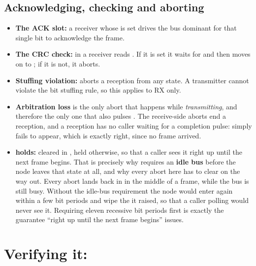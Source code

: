 \subsection*{Acknowledging, checking and aborting}
\begin{itemize}
  \item \textbf{The ACK slot:} a receiver whose  is set drives the bus dominant for
    that single bit to acknowledge the frame.
  \item \textbf{The CRC check:} in  a receiver reads . If it
    is set it waits for  and then moves on to ; if it is not,
    it aborts.
  \item \textbf{Stuffing violation:}  aborts a reception from any
    state. A transmitter cannot violate the bit stuffing rule, so this applies to RX only.
  \item \textbf{Arbitration loss} is the only abort that happens while \emph{transmitting}, and
    therefore the only one that also pulses . The receive-side aborts end a reception,
    and a reception has no caller waiting for a completion pulse:  simply fails to
    appear, which is exactly right, since no frame arrived.
  \item \textbf{ holds:} cleared in , held otherwise, so that a caller
    sees it right up until the next frame begins. That is precisely why  requires an
    \textbf{idle bus} before the node leaves that state at all, and why every abort here has to clear
     on the way out. Every abort lands back in  in the middle of a
    frame, while the bus is still busy. Without the idle-bus requirement the node would enter
     again within a few bit periods and wipe the  it raised, so that a
    caller polling  would never see it. Requiring eleven recessive bit periods first is
    exactly the guarantee ``right up until the next frame begins'' issues.
\end{itemize}

\section{Verifying it: }
\label{c17:sec:verify}

